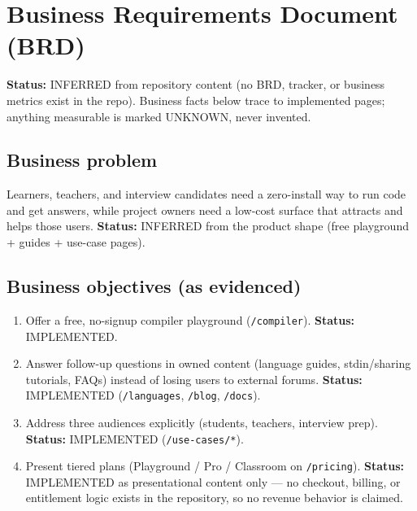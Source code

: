\section{Business Requirements Document (BRD)}
\label{sec:brd}

\textbf{Status:} INFERRED from repository content (no BRD, tracker, or business metrics exist in the repo). Business facts below trace to implemented pages; anything measurable is marked UNKNOWN, never invented.

\subsection{Business problem}
Learners, teachers, and interview candidates need a zero-install way to run code and get answers, while project owners need a low-cost surface that attracts and helps those users. \textbf{Status:} INFERRED from the product shape (free playground + guides + use-case pages).

\subsection{Business objectives (as evidenced)}
\begin{enumerate}
\item Offer a free, no-signup compiler playground (\texttt{/compiler}). \textbf{Status:} IMPLEMENTED.
\item Answer follow-up questions in owned content (language guides, stdin/sharing tutorials, FAQs) instead of losing users to external forums. \textbf{Status:} IMPLEMENTED (\texttt{/languages}, \texttt{/blog}, \texttt{/docs}).
\item Address three audiences explicitly (students, teachers, interview prep). \textbf{Status:} IMPLEMENTED (\texttt{/use-cases/*}).
\item Present tiered plans (Playground / Pro / Classroom on \texttt{/pricing}). \textbf{Status:} IMPLEMENTED as presentational content only --- no checkout, billing, or entitlement logic exists in the repository, so no revenue behavior is claimed.
\end{enumerate}

